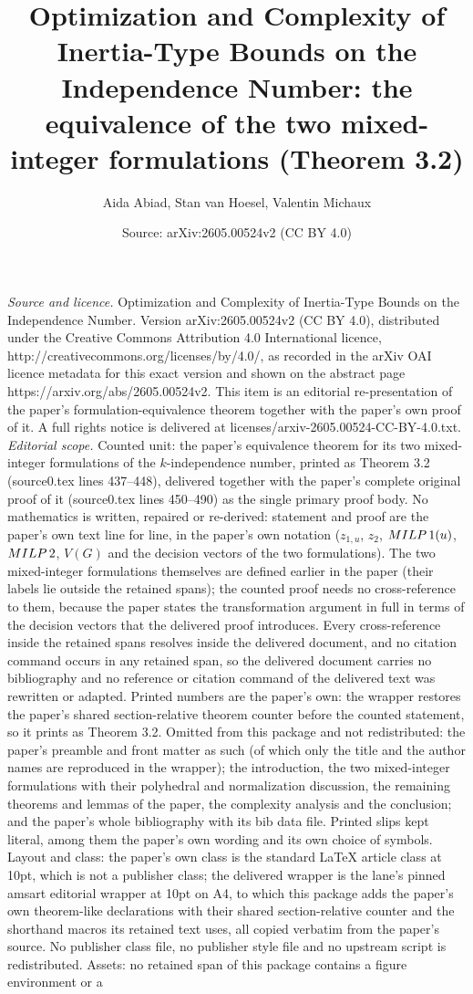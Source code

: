 \documentclass[10pt,a4paper]{amsart}
\title[Optimization and complexity of inertia-type bounds on the independence number]{Optimization and Complexity of Inertia-Type Bounds on the Independence Number: the equivalence of the two mixed-integer formulations (Theorem 3.2)}
\author[A. Abiad, S. van Hoesel, V. Michaux]{Aida Abiad, Stan van Hoesel, Valentin Michaux}
\date{Source: arXiv:2605.00524v2 (CC BY 4.0)}
\begin{document}
\maketitle
\vspace{1em}
\noindent\textit{Source and licence.} Optimization and Complexity of Inertia-Type Bounds on the Independence Number. Version arXiv:2605.00524v2 (CC BY 4.0), distributed under the Creative Commons Attribution 4.0 International licence, http://creativecommons.org/licenses/by/4.0/, as recorded in the arXiv OAI licence metadata for this exact version and shown on the abstract page https://arxiv.org/abs/2605.00524v2. This item is an editorial re-presentation of the paper's formulation-equivalence theorem together with the paper's own proof of it. A full rights notice is delivered at licenses/arxiv-2605.00524-CC-BY-4.0.txt.
\noindent\textit{Editorial scope.} Counted unit: the paper's equivalence theorem for its two mixed-integer formulations of the $k$-independence number, printed as Theorem 3.2 (source0.tex lines 437--448), delivered together with the paper's complete original proof of it (source0.tex lines 450--490) as the single primary proof body. No mathematics is written, repaired or re-derived: statement and proof are the paper's own text line for line, in the paper's own notation ($z_{1,u}$, $z_2$, $\textsc{MILP}\,1(u)$, $\textsc{MILP}\,2$, $V(G)$ and the decision vectors of the two formulations). The two mixed-integer formulations themselves are defined earlier in the paper (their labels lie outside the retained spans); the counted proof needs no cross-reference to them, because the paper states the transformation argument in full in terms of the decision vectors that the delivered proof introduces. Every cross-reference inside the retained spans resolves inside the delivered document, and no citation command occurs in any retained span, so the delivered document carries no bibliography and no reference or citation command of the delivered text was rewritten or adapted. Printed numbers are the paper's own: the wrapper restores the paper's shared section-relative theorem counter before the counted statement, so it prints as Theorem 3.2. Omitted from this package and not redistributed: the paper's preamble and front matter as such (of which only the title and the author names are reproduced in the wrapper); the introduction, the two mixed-integer formulations with their polyhedral and normalization discussion, the remaining theorems and lemmas of the paper, the complexity analysis and the conclusion; and the paper's whole bibliography with its bib data file. Printed slips kept literal, among them the paper's own wording and its own choice of symbols. Layout and class: the paper's own class is the standard LaTeX article class at 10pt, which is not a publisher class; the delivered wrapper is the lane's pinned amsart editorial wrapper at 10pt on A4, to which this package adds the paper's own theorem-like declarations with their shared section-relative counter and the shorthand macros its retained text uses, all copied verbatim from the paper's source. No publisher class file, no publisher style file and no upstream script is redistributed. Assets: no retained span of this package contains a figure environment or a 
\end{document}
